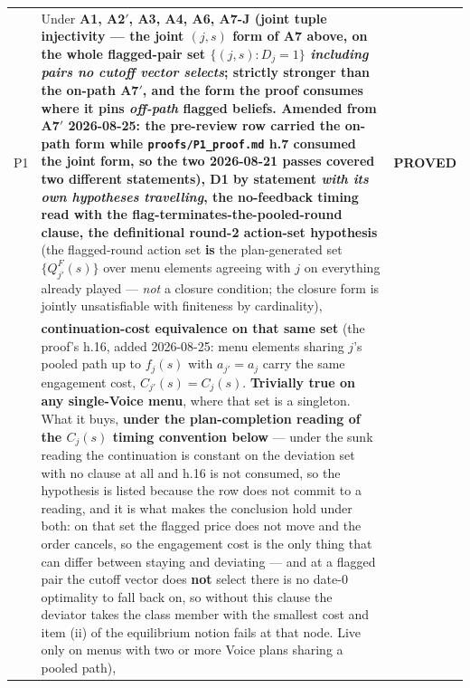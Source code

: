 \documentclass[11pt,a4paper]{article}
\begin{document}
\begin{longtable}{@{}p{}>{\raggedright\arraybackslash}p{}>{\raggedright\arraybackslash}p{}@{}}
P1 &
Under \textbf{A1, A2$'$, A3, A4, A6, A7-J (joint tuple injectivity --- the joint
$(j,s)$ form of A7 above, on the whole flagged-pair set $\{(j,s):D_j=1\}$
\emph{including pairs no cutoff vector selects}; strictly stronger than the on-path
A7$'$, and the form the proof consumes where it pins \emph{off-path} flagged beliefs.
Amended from A7$'$ 2026-08-25: the pre-review row carried the on-path form while
\texttt{proofs/P1\_proof.md} h.7 consumed the joint form, so the two 2026-08-21 passes
covered two different statements), D1 by statement \emph{with its own hypotheses
travelling}, the no-feedback timing read with the flag-terminates-the-pooled-round
clause, the definitional round-2 action-set hypothesis} (the flagged-round action set
\textbf{is} the plan-generated set $\{Q^F_{j'}(s)\}$ over menu elements agreeing with
$j$ on everything already played --- \emph{not} a closure condition; the closure form is
jointly unsatisfiable with finiteness by cardinality), &
\textbf{PROVED} \\

&
\textbf{continuation-cost equivalence on that same set} (the proof's h.16, added
2026-08-25: menu elements sharing $j$'s pooled path up to $f_j(s)$ with $a_{j'}=a_j$
carry the same engagement cost, $C_{j'}(s)=C_j(s)$. \textbf{Trivially true on any
single-Voice menu}, where that set is a singleton. What it buys, \textbf{under the
plan-completion reading of the $C_j(s)$ timing convention below} --- under the sunk
reading the continuation is constant on the deviation set with no clause at all and h.16
is not consumed, so the hypothesis is listed because the row does not commit to a
reading, and it is what makes the conclusion hold under both: on that set the flagged
price does not move and the order cancels, so the engagement cost is the only thing that
can differ between staying and deviating --- and at a flagged pair the cutoff vector does
\textbf{not} select there is no date-0 optimality to fall back on, so without this clause
the deviator takes the class member with the smallest cost and item (ii) of the
equilibrium notion fails at that node. Live only on menus with two or more Voice plans
sharing a pooled path), &
\\


\end{longtable}
\end{document}
